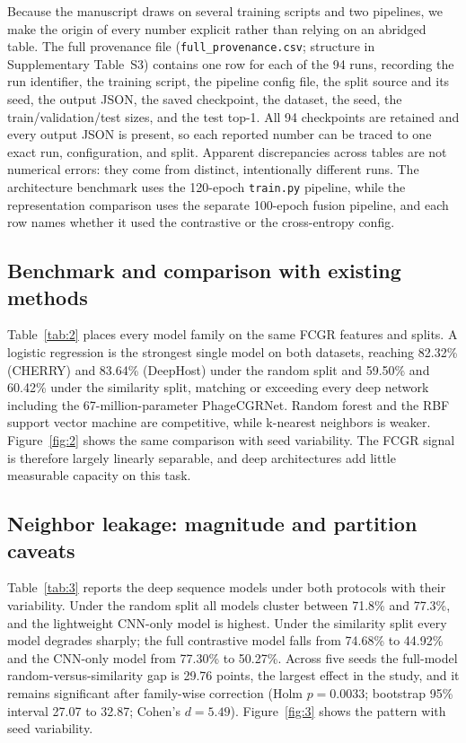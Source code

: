 \documentclass[utf8]{FrontiersinVancouver}
\begin{document}
Because the manuscript draws on several training scripts and two pipelines, we make the origin of every number explicit rather than relying on an abridged table. The full provenance file (\texttt{full\_provenance.csv}; structure in Supplementary Table~S3) contains one row for each of the 94 runs, recording the run identifier, the training script, the pipeline config file, the split source and its seed, the output JSON, the saved checkpoint, the dataset, the seed, the train/validation/test sizes, and the test top-1. All 94 checkpoints are retained and every output JSON is present, so each reported number can be traced to one exact run, configuration, and split. Apparent discrepancies across tables are not numerical errors: they come from distinct, intentionally different runs. The architecture benchmark uses the 120-epoch \texttt{train.py} pipeline, while the representation comparison uses the separate 100-epoch fusion pipeline, and each row names whether it used the contrastive or the cross-entropy config.

\subsection{Benchmark and comparison with existing methods}

Table~\ref{tab:2} places every model family on the same FCGR features and splits. A logistic regression is the strongest single model on both datasets, reaching 82.32\% (CHERRY) and 83.64\% (DeepHost) under the random split and 59.50\% and 60.42\% under the similarity split, matching or exceeding every deep network including the 67-million-parameter PhageCGRNet. Random forest and the RBF support vector machine are competitive, while k-nearest neighbors is weaker. Figure~\ref{fig:2} shows the same comparison with seed variability. The FCGR signal is therefore largely linearly separable, and deep architectures add little measurable capacity on this task.

\subsection{Neighbor leakage: magnitude and partition caveats}

Table~\ref{tab:3} reports the deep sequence models under both protocols with their variability. Under the random split all models cluster between 71.8\% and 77.3\%, and the lightweight CNN-only model is highest. Under the similarity split every model degrades sharply; the full contrastive model falls from 74.68\% to 44.92\% and the CNN-only model from 77.30\% to 50.27\%. Across five seeds the full-model random-versus-similarity gap is 29.76 points, the largest effect in the study, and it remains significant after family-wise correction (Holm $p=0.0033$; bootstrap 95\% interval 27.07 to 32.87; Cohen's $d=5.49$). Figure~\ref{fig:3} shows the pattern with seed variability.
\end{document}

